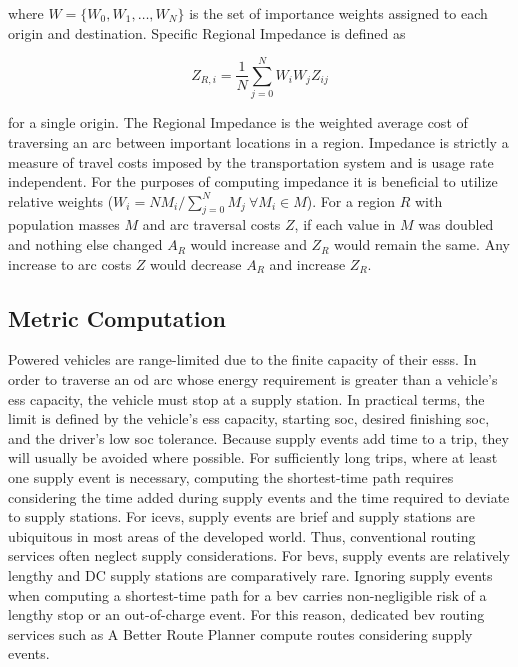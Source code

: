 \noindent where $W = \{W_0, W_1, \dots, W_N\}$ is the set of importance weights assigned to each origin and destination. Specific Regional Impedance is defined as

\begin{equation}
	Z_{R,i} = \frac{1}{N}\sum_{j = 0 }^{N} W_iW_jZ_{ij} \label{eq:specific_regional_impedance}
\end{equation}

for a single origin. The Regional Impedance is the weighted average cost of traversing an arc between important locations in a region. Impedance is strictly a measure of travel costs imposed by the transportation system and is usage rate independent. For the purposes of computing impedance it is beneficial to utilize relative weights ($W_i = NM_i / \sum_{j = 0}^{N} M_j\ \forall M_i \in M$). For a region $R$ with population masses $M$ and arc traversal costs $Z$, if each value in $M$ was doubled and nothing else changed $A_R$ would increase and $Z_R$ would remain the same. Any increase to arc costs $Z$ would decrease $A_R$ and increase $Z_R$.

\subsection*{Metric Computation}

Powered vehicles are range-limited due to the finite capacity of their \glspl{ess}. In order to traverse an \gls{od} arc whose energy requirement is greater than a vehicle's \gls{ess} capacity, the vehicle must stop at a supply station. In practical terms, the limit is defined by the vehicle's \gls{ess} capacity, starting \gls{soc}, desired finishing \gls{soc}, and the driver's low \gls{soc} tolerance. Because supply events add time to a trip, they will usually be avoided where possible. For sufficiently long trips, where at least one supply event is necessary, computing the shortest-time path requires considering the time added during supply events and the time required to deviate to supply stations. For \glspl{icev}, supply events are brief and supply stations are ubiquitous in most areas of the developed world. Thus, conventional routing services often neglect supply considerations. For \glspl{bev}, supply events are relatively lengthy and DC supply stations are comparatively rare. Ignoring supply events when computing a shortest-time path for a \gls{bev} carries non-negligible risk of a lengthy stop or an out-of-charge event. For this reason, dedicated \gls{bev} routing services such as A Better Route Planner compute routes considering supply events.

